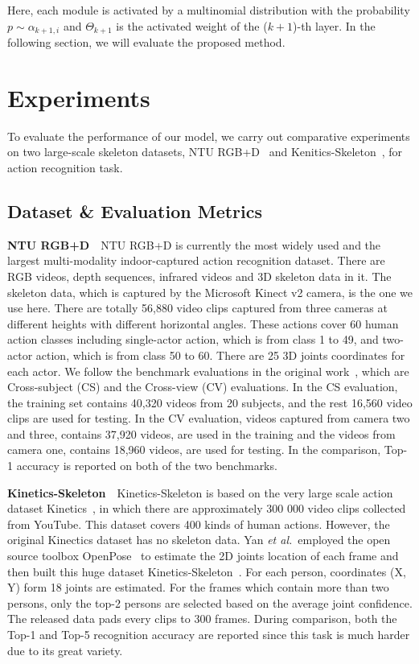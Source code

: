 \documentclass[letterpaper]{article} \usepackage{aaai19}  \usepackage{times}  \usepackage{helvet} \usepackage{courier}  \usepackage[hyphens]{url}  \usepackage{graphicx} \urlstyle{rm} \def\UrlFont{\rm}  \usepackage{graphicx}  \frenchspacing  \setlength{\pdfpagewidth}{8.5in}  \setlength{\pdfpageheight}{11in}
\def\etal{\emph{et al.}}
\begin{document}
\noindent Here, each module is activated by a multinomial distribution with the probability $p\sim \alpha_{k+1,i}$ and $\Theta_{k+1}$ is the activated weight of the ($k+1$)-th layer. In the following section, we will evaluate the proposed method.








\section{Experiments}
To evaluate the performance of our model, we carry out comparative experiments on two large-scale skeleton datasets, NTU RGB+D~\cite{shahroudy2016ntu} and Kenitics-Skeleton~\cite{kay2017kinetics,yan2018stgan}, for action recognition task.



\subsection{Dataset \& Evaluation Metrics} 

\textbf{NTU RGB+D}~~NTU RGB+D is currently the most widely used and the largest multi-modality indoor-captured action recognition dataset. There are RGB videos, depth sequences, infrared videos and 3D skeleton data in it. The skeleton data, which is captured by the Microsoft Kinect v2 camera, is the one we use here. There are totally 56,880 video clips captured from three cameras at different heights with different horizontal angles. These actions cover 60 human action classes including single-actor action, which is from class 1 to 49, and two-actor action, which is from class 50 to 60. There are 25 3D joints coordinates for each actor. We follow the benchmark evaluations in the original work~\cite{shahroudy2016ntu}, which are Cross-subject (CS) and the Cross-view (CV) evaluations.  In the CS evaluation, the training set contains 40,320 videos from 20 subjects, and the rest 16,560 video clips are used for testing. In the CV evaluation, videos captured from camera two and three, contains 37,920 videos, are used in the training and the videos from camera one, contains 18,960 videos, are used for testing. In the comparison, Top-1 accuracy is reported on both of the two benchmarks. 

\noindent \textbf{Kinetics-Skeleton}~~Kinetics-Skeleton is based on the very large scale action dataset Kinetics~\cite{kay2017kinetics}, in which there are approximately 300 000 video clips collected from YouTube. This dataset covers 400 kinds of human actions. However, the original Kinectics dataset has no skeleton data. Yan \etal~employed the open source toolbox OpenPose~\cite{Cao_2017} to estimate the 2D joints location of each frame and then built this huge dataset Kinetics-Skeleton~\cite{yan2018stgan}. For each person, coordinates (X, Y) form 18 joints are estimated. For the frames which contain more than two persons, only the top-2 persons are selected based on the average joint confidence. The released data pads every clips to 300 frames. During comparison, both the Top-1 and Top-5 recognition accuracy are reported since this task is much harder due to its great variety.
\end{document}
